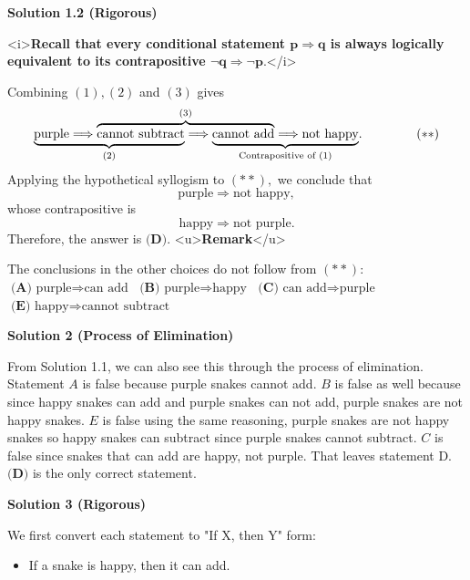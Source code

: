 \begin{enumerate}
\textbf{Solution 1.2 (Rigorous)}

<i>\textbf{Recall that every conditional statement $\boldsymbol{p\Longrightarrow q}$ is always logically equivalent to its contrapositive $\boldsymbol{\lnot q\Longrightarrow\lnot p.}$}</i>

 Combining $(1),(2)$ and $(3)$ gives 
 \[\lefteqn{\underbrace{\phantom{\text{purple}\Longrightarrow\text{cannot subtract}}}_{(2)}}\text{purple}\Longrightarrow\overbrace{\text{cannot subtract}\Longrightarrow\lefteqn{\underbrace{\phantom{\text{cannot add}\Longrightarrow\text{not happy}}}_{\text{Contrapositive of }(1)}}\text{cannot add}}^{(3)}\Longrightarrow\text{not happy}. \hspace{15mm}(**)\] Applying the hypothetical syllogism to $(**),$ we conclude that 
 \[\text{purple}\Longrightarrow\text{not happy},\] whose contrapositive is 
 \[\text{happy}\Longrightarrow\text{not purple}.\] Therefore, the answer is $\boxed{\textbf{(D)}}.$
<u>\textbf{Remark}</u>

 The conclusions in the other choices do not follow from $(**):$
$\textbf{(A) }\text{purple}\Longrightarrow\text{can add}$
$\textbf{(B) }\text{purple}\Longrightarrow\text{happy}$
$\textbf{(C) }\text{can add}\Longrightarrow\text{purple}$
$\textbf{(E) }\text{happy}\Longrightarrow\text{cannot subtract}$




\textbf{Solution 2 (Process of Elimination)}

From Solution 1.1, we can also see this through the process of elimination. Statement $A$ is false because purple snakes cannot add. $B$ is false as well  because since happy snakes can add and purple snakes can not add, purple snakes are not happy snakes. $E$ is false using the same reasoning, purple snakes are not happy snakes so happy snakes can subtract since purple snakes cannot subtract. $C$ is false since snakes that can add are happy, not purple. That leaves statement D. $\boxed{\textbf{(D)}}$ is the only correct statement.

 



\textbf{Solution 3 (Rigorous)}

We first convert each statement to "If X, then Y" form:

 
            \begin{itemize}
        \item If a snake is happy, then it can add.
            \end{itemize}
            

\end{enumerate}
